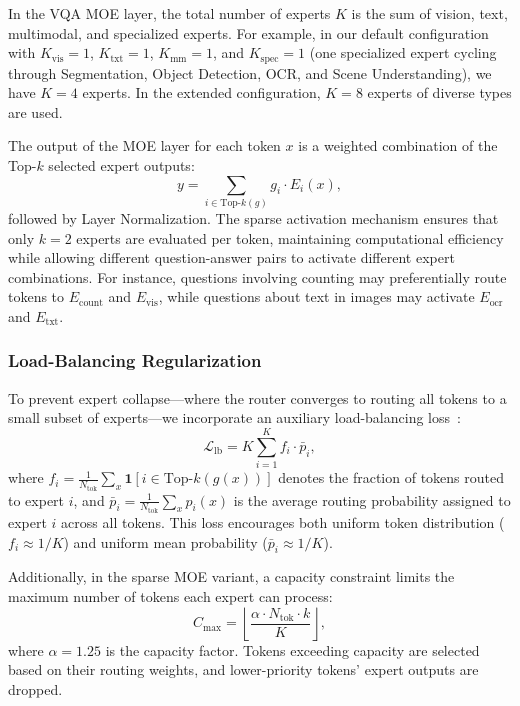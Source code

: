 In the VQA MOE layer, the total number of experts $K$ is the sum of vision, text, multimodal, and specialized experts. For example, in our default configuration with $K_{\text{vis}} = 1$, $K_{\text{txt}} = 1$, $K_{\text{mm}} = 1$, and $K_{\text{spec}} = 1$ (one specialized expert cycling through Segmentation, Object Detection, OCR, and Scene Understanding), we have $K = 4$ experts. In the extended configuration, $K = 8$ experts of diverse types are used.

The output of the MOE layer for each token $x$ is a weighted combination of the Top-$k$ selected expert outputs:
\begin{equation}
    y = \sum_{i \in \text{Top-}k(g)} g_i \cdot E_i(x),
    \label{eq:moe_output}
\end{equation}
followed by Layer Normalization. The sparse activation mechanism ensures that only $k = 2$ experts are evaluated per token, maintaining computational efficiency while allowing different question-answer pairs to activate different expert combinations. For instance, questions involving counting may preferentially route tokens to $E_{\text{count}}$ and $E_{\text{vis}}$, while questions about text in images may activate $E_{\text{ocr}}$ and $E_{\text{txt}}$.

\subsubsection{Load-Balancing Regularization}
\label{sec:method:fusion:balance}

To prevent expert collapse---where the router converges to routing all tokens to a small subset of experts---we incorporate an auxiliary load-balancing loss~\cite{shazeer2017outrageously, fedus2022switch}:
\begin{equation}
    \mathcal{L}_{\text{lb}} = K \sum_{i=1}^{K} f_i \cdot \bar{p}_i,
    \label{eq:load_balance}
\end{equation}
where $f_i = \frac{1}{N_{\text{tok}}} \sum_{x} \mathbf{1}[i \in \text{Top-}k(g(x))]$ denotes the fraction of tokens routed to expert $i$, and $\bar{p}_i = \frac{1}{N_{\text{tok}}} \sum_{x} p_i(x)$ is the average routing probability assigned to expert $i$ across all tokens. This loss encourages both uniform token distribution ($f_i \approx 1/K$) and uniform mean probability ($\bar{p}_i \approx 1/K$).

Additionally, in the sparse MOE variant, a capacity constraint limits the maximum number of tokens each expert can process:
\begin{equation}
    C_{\max} = \left\lfloor \frac{\alpha \cdot N_{\text{tok}} \cdot k}{K} \right\rfloor,
\end{equation}
where $\alpha = 1.25$ is the capacity factor. Tokens exceeding capacity are selected based on their routing weights, and lower-priority tokens' expert outputs are dropped.


